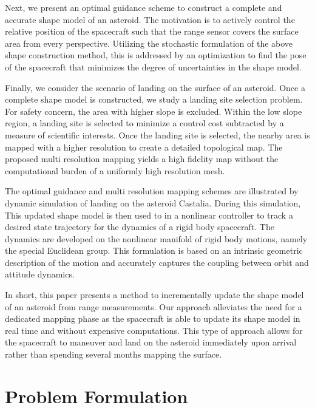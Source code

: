 \documentclass[journal]{new-aiaa}
\begin{document}
Next, we present an optimal guidance scheme to construct a complete and accurate shape model of an asteroid. 
The motivation is to actively control the relative position of the spacecraft such that the range sensor covers the surface area from every perspective. 
Utilizing the stochastic formulation of the above shape construction method, this is addressed by an optimization to find the pose of the spacecraft that minimizes the degree of uncertainties in the shape model. 

Finally, we consider the scenario of landing on the surface of an asteroid. 
Once a complete shape model is constructed, we study a landing site selection problem. 
For safety concern, the area with higher slope is excluded. 
Within the low slope region, a landing site is selected to minimize a control cost subtracted by a measure of scientific interests. 
Once the landing site is selected, the nearby area is mapped with a higher resolution to create a detailed topological map.  
The proposed multi resolution mapping yields a high fidelity map without the computational burden of a uniformly high resolution mesh.  

The optimal guidance and multi resolution mapping schemes are illustrated by dynamic simulation of landing on the asteroid Castalia. 
During this simulation, This updated shape model is then used to in a nonlinear controller to track a desired state trajectory for the dynamics of a rigid body spacecraft.
The dynamics are developed on the nonlinear manifold of rigid body motions, namely the special Euclidean group.
This formulation is based on an intrinsic geometric description of the motion and accurately captures the coupling between orbit and attitude dynamics. 


In short, this paper presents a method to incrementally update the shape  model of an asteroid from range measurements. 
Our approach alleviates the need for a dedicated mapping phase as the spacecraft is able to update its shape model in real time and without expensive computations.
This type of approach allows for the spacecraft to maneuver and land on the asteroid immediately upon arrival rather than spending several months mapping the surface.

\section{Problem Formulation}\label{sec:problem}
\end{document}
